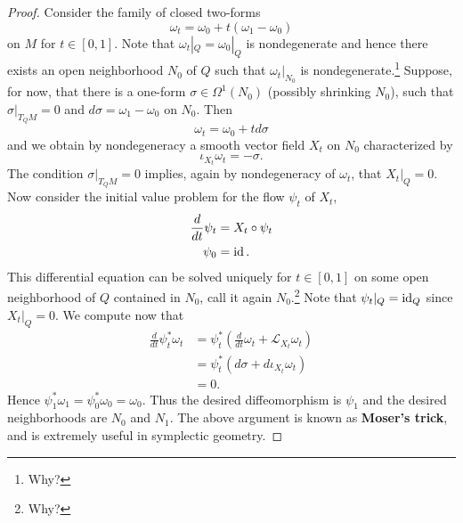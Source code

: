 \documentclass{amsart}
\begin{document}
\begin{proof}
    Consider the family of closed two-forms
    \begin{equation*}
        \omega_t = \omega_0 + t(\omega_1-\omega_0)
    \end{equation*}
    on $M$ for $t\in[0,1]$. Note that $\omega_t|_Q=\omega_0|_Q$ is nondegenerate and hence there exists
    an open neighborhood $N_0$ of $Q$ such that $\omega_t|_{N_0}$ is nondegenerate.\footnote{Why?} Suppose,
    for now, that there is a one-form $\sigma\in\Omega^1(N_0)$ (possibly shrinking $N_0$), such that
    $\sigma|_{T_QM}=0$ and $d\sigma=\omega_1-\omega_0$ on $N_0$. Then
    \begin{equation*}
        \omega_t = \omega_0+td\sigma
    \end{equation*}
    and we obtain by nondegeneracy a smooth vector field $X_t$ on $N_0$ characterized by
    \begin{equation*}
        \iota_{X_t}\omega_t = -\sigma.
    \end{equation*}
    The condition $\sigma|_{T_QM}=0$ implies, again by nondegeneracy of $\omega_t$, that $X_t|_Q=0$.
    Now consider the initial value problem for the flow $\psi_t$ of $X_t$,
    \begin{align*}
        \frac{d}{dt}\psi_t &= X_t \circ \psi_t\\
        \psi_0 &= \operatorname{id}.
    \end{align*}
    This differential equation can be solved uniquely for $t\in[0,1]$ on some open neighborhood of
    $Q$ contained in $N_0$, call it again $N_0$.\footnote{Why?} Note that $\psi_t|_Q=\operatorname{id}_Q$ since $X_t|_Q=0$.
    We compute now that
    \begin{align*}
        \frac{d}{dt}\psi_t^*\omega_t &= \psi_t^*\left( \frac{d}{dt}\omega_t + \mathcal{L}_{X_t}\omega_t \right)\\
        &= \psi_t^*\left( d\sigma + d\iota_{X_t}\omega_t\right)\\
        &= 0.
    \end{align*}
    Hence $\psi_1^*\omega_1=\psi_0^*\omega_0=\omega_0$. Thus the desired diffeomorphism is
    $\psi_1$ and the desired neighborhoods are $N_0$ and $N_1$.
    The above argument is known as \textbf{Moser's trick}, and is extremely useful in symplectic
    geometry.
    

\end{proof}
\end{document}
